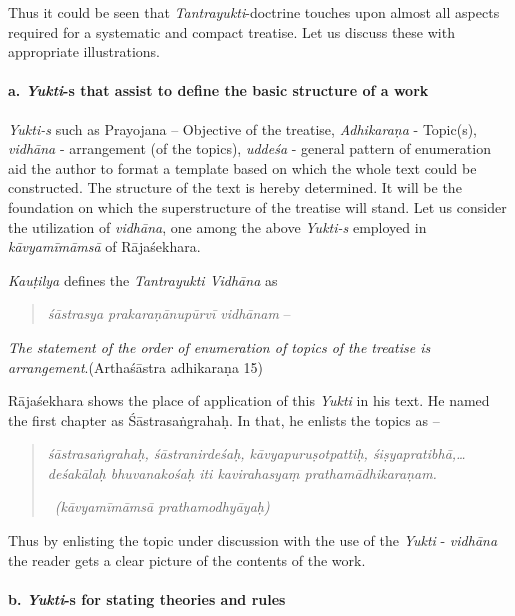 Thus it could be seen that \textit{Tantrayukti}-doctrine touches upon almost all aspects required for a systematic and compact treatise. Let us discuss these with appropriate illustrations.

\paragraph*{a. \textit{Yukti}-s that assist to define the basic structure of a work}

\textit{Yukti-s} such as Prayojana – Objective of the treatise, \textit{Adhikaraṇa} - Topic(s), \textit{vidhāna} - arrangement (of the topics), \textit{uddeśa} - general pattern of enumeration aid the author to format a template based on which the whole text could be constructed. The structure of the text is hereby determined. It will be the foundation on which the superstructure of the treatise will stand. Let us consider the utilization of \textit{vidhāna}, one among the above \textit{Yukti-s} employed in \textit{kāvyamīmāmsā} of Rājaśekhara.

\textit{Kauṭilya} defines the \textit{Tantrayukti Vidhāna} as

\begin{verse}
\textit{śāstrasya prakaraṇānupūrvī vidhānam} –
\end{verse}

\begin{myquote}
\textit{The statement of the order of enumeration of topics of the treatise is arrangement}.\hfill (Arthaśāstra adhikaraṇa 15)
\end{myquote}

Rājaśekhara shows the place of application of this \textit{Yukti} in his text. He named the first chapter as Śāstrasaṅgrahaḥ. In that, he enlists the topics as –

\begin{quote}
\textit{śāstrasaṅgrahaḥ, śāstranirdeśaḥ, kāvyapuruṣotpattiḥ, śiṣyapra\-tibhā,…deśakālaḥ bhuvanakośaḥ iti kavirahasyaṃ prathamādhi\-karaṇam.}

~\hfill \textit{(kāvyamīmāmsā prathamodhyāyaḥ)}
\end{quote}

Thus by enlisting the topic under discussion with the use of the \textit{Yukti} - \textit{vidhāna} the reader gets a clear picture of the contents of the work.


\paragraph*{b. \textit{Yukti}-s for stating theories and rules}


